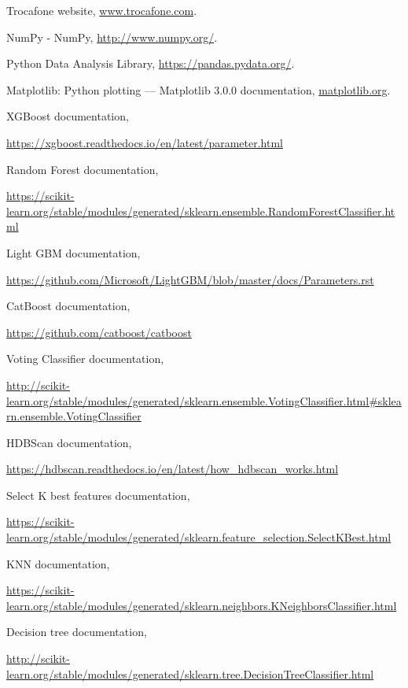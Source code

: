 \documentclass[a4paper ,12pt]{article}
\begin{document}
\begin{thebibliography}{99}
		
	\bibitem{}Trocafone website, \url{www.trocafone.com}.
	
	\bibitem{} NumPy - NumPy, \url{http://www.numpy.org/}.
	
	\bibitem{} Python Data Analysis Library,
	\url{https://pandas.pydata.org/}.
	
	\bibitem{}	Matplotlib: Python plotting — Matplotlib 3.0.0 documentation,
	\url{matplotlib.org}.


	\bibitem{} XGBoost documentation,

	\url{
	https://xgboost.readthedocs.io/en/latest/parameter.html}

	\bibitem{} Random Forest documentation,

	\url{
	https://scikit-learn.org/stable/modules/generated/sklearn.ensemble.RandomForestClassifier.html}

	\bibitem{} Light GBM documentation,

	\url{
	https://github.com/Microsoft/LightGBM/blob/master/docs/Parameters.rst}

	\bibitem{} CatBoost documentation,
	
	\url{
	https://github.com/catboost/catboost}

	\bibitem{} Voting Classifier documentation,

	\url{
	http://scikit-learn.org/stable/modules/generated/sklearn.ensemble.VotingClassifier.html#sklearn.ensemble.VotingClassifier}
	
	\bibitem{} HDBScan documentation,
	
	\url{
		https://hdbscan.readthedocs.io/en/latest/how\_hdbscan\_works.html}

	\bibitem{} Select K best features documentation,
	
	\url{
		https://scikit-learn.org/stable/modules/generated/sklearn.feature\_selection.SelectKBest.html}
	
	\bibitem{} KNN documentation,
	
	\url{
		https://scikit-learn.org/stable/modules/generated/sklearn.neighbors.KNeighborsClassifier.html}
	
	\bibitem{} Decision tree documentation,
	
	\url{
			http://scikit-learn.org/stable/modules/generated/sklearn.tree.DecisionTreeClassifier.html}
	

	
	







	

	
\end{thebibliography}
\end{document}
